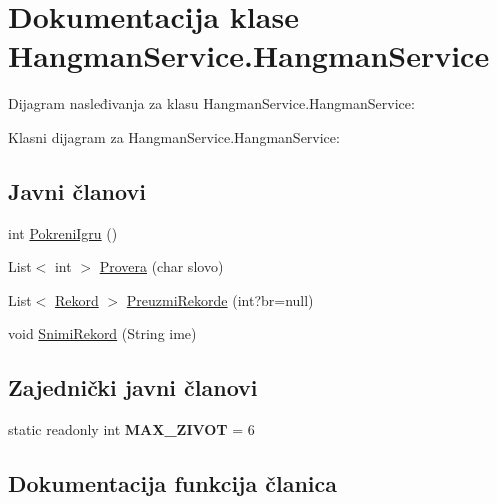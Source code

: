 \hypertarget{classHangmanService_1_1HangmanService}{}\section{Dokumentacija klase Hangman\+Service.\+Hangman\+Service}
\label{classHangmanService_1_1HangmanService}


Dijagram nasleđivanja za klasu Hangman\+Service.\+Hangman\+Service\+:


Klasni dijagram za Hangman\+Service.\+Hangman\+Service\+:
\subsection*{Javni članovi}
\begin{DoxyCompactItemize}
\item 
int \hyperlink{classHangmanService_1_1HangmanService_aa9fc92b190437b0c4e4e2b7fabe25764}{Pokreni\+Igru} ()
\item 
List$<$ int $>$ \hyperlink{classHangmanService_1_1HangmanService_a72901eff26b80977d4ee25f277858ec3}{Provera} (char slovo)
\item 
List$<$ \hyperlink{classHangman_1_1Rekord}{Rekord} $>$ \hyperlink{classHangmanService_1_1HangmanService_a8ace42822c4d95d22e7adc7452b39baa}{Preuzmi\+Rekorde} (int?br=null)
\item 
void \hyperlink{classHangmanService_1_1HangmanService_a18a21a7d8bf98162cb4b827490b92781}{Snimi\+Rekord} (String ime)
\end{DoxyCompactItemize}
\subsection*{Zajednički javni članovi}
\begin{DoxyCompactItemize}
\item 
\hypertarget{classHangmanService_1_1HangmanService_a6bf8f7c7a71c6396215d03fcbd999ec8}{}static readonly int {\bfseries M\+A\+X\+\_\+\+Z\+I\+V\+O\+T} = 6\label{classHangmanService_1_1HangmanService_a6bf8f7c7a71c6396215d03fcbd999ec8}

\end{DoxyCompactItemize}


\subsection{Dokumentacija funkcija članica}
\hypertarget{classHangmanService_1_1HangmanService_aa9fc92b190437b0c4e4e2b7fabe25764}{}
